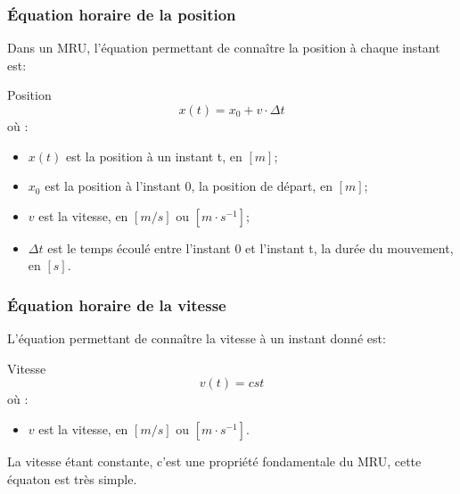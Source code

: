 \subsubsection{Équation horaire de la position}
Dans un MRU, l'équation permettant de connaître la position à chaque instant est:
\begin{encadre_equation*}{Position}
    \begin{equation}
        x(t)=x_0+v \cdot \Delta t
    \end{equation}
    où :
    \begin{itemize}[label=\textbullet]
        \item \(x(t)\) est la position à un instant t, en \(\unit{[m]}\);
        \item \(x_0\) est la position à l'instant 0, la position de départ, en \(\unit{[m]}\);
        \item \(v\) est la vitesse, en \(\unit{[m/s]}\) ou \(\unit{[m \cdot s^{-1}]}\);
        \item \(\Delta t\) est le temps écoulé entre l'instant 0 et l'instant t, la durée du mouvement, en \([s]\).
    \end{itemize}
\end{encadre_equation*}

\newpage

\subsubsection{Équation horaire de la vitesse}
L'équation permettant de connaître la vitesse à un instant donné est:
\begin{encadre_equation*}{Vitesse}
    \begin{equation}
        v(t)=cst
    \end{equation}
    où :
    \begin{itemize}[label= \textbullet]
        \item \(v\) est la vitesse, en \(\unit{[m/s]}\) ou \(\unit{[m \cdot s^{-1}]}\).
    \end{itemize}
\end{encadre_equation*}
La vitesse étant constante, c'est une propriété fondamentale du MRU, cette équaton est très simple.

\newpage


